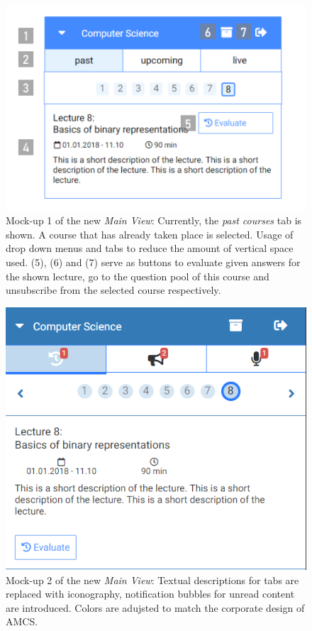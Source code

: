 \begin{figure}[ht]
	\centering
	\begin{minipage}[t]{.7\textwidth}
		\includegraphics[width=\textwidth]{mockups/main_view_enhancement_v1_annotated.png}
			\captionsetup{width=.8\linewidth}
		\caption{Mock-up 1 of the new \emph{Main View}: Currently, the \emph{past courses} tab is shown.
		A course that has already taken place is selected.
		Usage of drop down menus and tabs to reduce the amount of vertical space used. (5), (6) and (7) serve as buttons to evaluate given answers for the shown lecture, go to the question pool of this course and unsubscribe from the selected course respectively.
		}
		\label{figure:mainviewenhancement}
	\end{minipage}%
\end{figure}
\begin{figure}[ht]
	\begin{minipage}[t]{\textwidth}
		\centering
		\includegraphics[width=.7\textwidth]{mockups/main_view_enhancement_v2_cropped.png}
				\captionsetup{width=.8\linewidth}
		\caption{Mock-up 2 of the new \emph{Main View}:
			Textual descriptions for tabs are replaced with iconography, notification
			bubbles for unread content are introduced. Colors are adujsted to match the corporate design of AMCS.
		}
		\label{figure:mainviewenhancement2}
	\end{minipage}
\end{figure}
